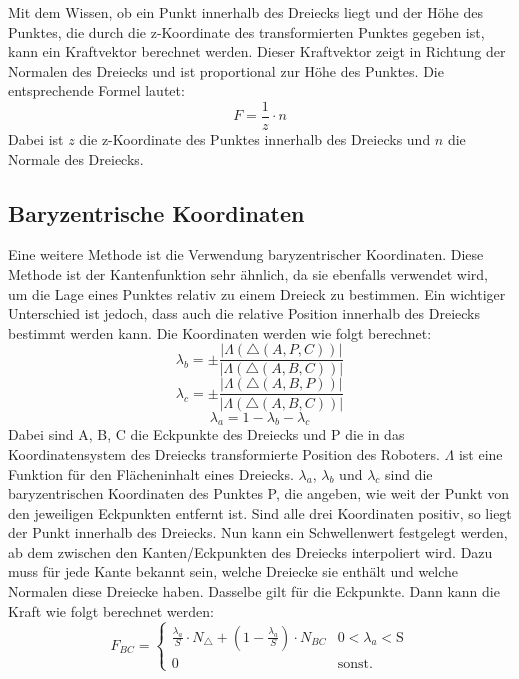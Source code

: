 \documentclass[conference]{IEEEtran}
\begin{document}
Mit dem Wissen, ob ein Punkt innerhalb des Dreiecks liegt und der Höhe des Punktes, die durch die z-Koordinate des transformierten Punktes gegeben ist, kann ein Kraftvektor berechnet werden. Dieser Kraftvektor zeigt in Richtung der Normalen des Dreiecks und ist proportional zur Höhe des Punktes. Die entsprechende Formel lautet:
\begin{equation}
    F = \frac{1}{z} \cdot n
\end{equation}
Dabei ist $z$ die z-Koordinate des Punktes innerhalb des Dreiecks und $n$ die Normale des Dreiecks.

\subsection{Baryzentrische Koordinaten} \label{bary}
Eine weitere Methode ist die Verwendung baryzentrischer Koordinaten. Diese Methode ist der Kantenfunktion sehr ähnlich, da sie ebenfalls verwendet wird, um die Lage eines Punktes relativ zu einem Dreieck zu bestimmen. Ein wichtiger Unterschied ist jedoch, dass auch die relative Position innerhalb des Dreiecks bestimmt werden kann. Die Koordinaten werden wie folgt berechnet:
\begin{equation*}
    \lambda_b = \pm\frac{|\Lambda(\triangle(A,P,C))|}{|\Lambda(\triangle(A,B,C))|}
\end{equation*}
\begin{equation}
    \lambda_c = \pm\frac{|\Lambda(\triangle(A,B,P))|}{|\Lambda(\triangle(A,B,C))|}
\end{equation}
\begin{equation*}
    \lambda_a = 1 - \lambda_b - \lambda_c
\end{equation*}
Dabei sind A, B, C die Eckpunkte des Dreiecks und P die in das Koordinatensystem des Dreiecks transformierte Position des Roboters. $\Lambda$ ist eine Funktion für den Flächeninhalt eines Dreiecks. $\lambda_a$, $\lambda_b$ und $\lambda_c$ sind die baryzentrischen Koordinaten des Punktes P, die angeben, wie weit der Punkt von den jeweiligen Eckpunkten entfernt ist. Sind alle drei Koordinaten positiv, so liegt der Punkt innerhalb des Dreiecks. Nun kann ein Schwellenwert festgelegt werden, ab dem zwischen den Kanten/Eckpunkten des Dreiecks interpoliert wird. Dazu muss für jede Kante bekannt sein, welche Dreiecke sie enthält und welche Normalen diese Dreiecke haben. Dasselbe gilt für die Eckpunkte. Dann kann die Kraft wie folgt berechnet werden:
\begin{equation*}
    F_{BC} = 
    \begin{cases} 
        \frac{\lambda_a}{S}\cdot N_{\triangle} + (1-\frac{\lambda_a}{S})\cdot N_{BC} &  0 < \lambda_a < \text{S} \\
        0 & \text{sonst.}
    \end{cases}
\end{equation*}
\end{document}
